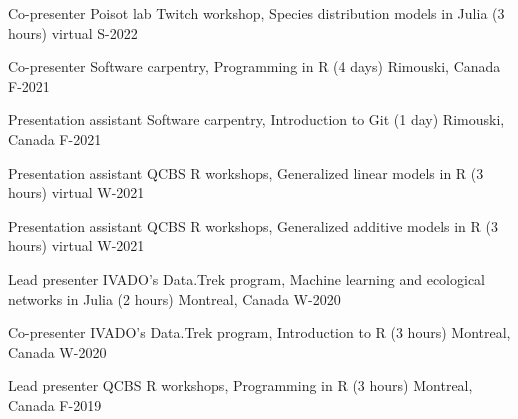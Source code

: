 \begin{cvhonors}

  \cvhonor
    {Co-presenter} %
    {Poisot lab Twitch workshop, Species distribution models in Julia (3 hours)} %
    {virtual} %
    {S-2022} %

  \cvhonor
    {Co-presenter} %
    {Software carpentry, Programming in R (4 days)} %
    {Rimouski, Canada} %
    {F-2021} %

  \cvhonor
    {Presentation assistant} %
    {Software carpentry, Introduction to Git (1 day)} %
    {Rimouski, Canada} %
    {F-2021} %

  \cvhonor
    {Presentation assistant} %
    {QCBS R workshops, Generalized linear models in R (3 hours)} %
    {virtual} %
    {W-2021} %

  \cvhonor
    {Presentation assistant} %
    {QCBS R workshops, Generalized additive models in R (3 hours)} %
    {virtual} %
    {W-2021} %
    
  \cvhonor
    {Lead presenter} %
    {IVADO's Data.Trek program, Machine learning and ecological networks in Julia (2 hours)} %
    {Montreal, Canada} %
    {W-2020} %

  \cvhonor
    {Co-presenter} %
    {IVADO's Data.Trek program, Introduction to R (3 hours)} %
    {Montreal, Canada} %
    {W-2020} %

  \cvhonor
    {Lead presenter} %
    {QCBS R workshops, Programming in R (3 hours)} %
    {Montreal, Canada} %
    {F-2019} %
    
\end{cvhonors}
